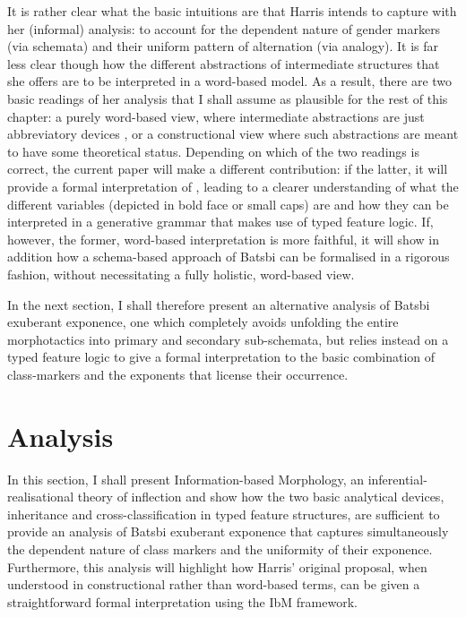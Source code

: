 \documentclass[output=paper]{langsci/langscibook}
\begin{document}
It is rather clear what the basic intuitions are that Harris intends
to capture with her (informal) analysis: to account for the dependent
nature of gender markers (via schemata) and their uniform pattern of
alternation (via analogy). It is far less clear though how the
different abstractions of intermediate structures that she offers are
to be interpreted in a word-based model. As a result, there are two
basic readings of her analysis that I shall assume as plausible for
the rest of this chapter: a purely word-based view, where intermediate
abstractions are just abbreviatory devices \citep[p.~298]{Harris09},
or a constructional view where such abstractions are meant to have
some theoretical status. Depending on which of the two readings
is correct, the current paper will make a different contribution: if
the latter, it will provide a formal interpretation of
\citet{Harris09}, leading to a clearer understanding of what the different
variables (depicted in bold face or small caps) are and how they can
be interpreted in a generative grammar that makes use of typed feature
logic.  If, however, the former, word-based interpretation is more
faithful, it will show in addition how a schema-based approach of
Batsbi can be formalised in a rigorous fashion, without necessitating
a fully holistic, word-based view.

In the next section, I shall therefore present an alternative analysis
of Batsbi exuberant exponence, one which completely avoids unfolding the
entire morphotactics into primary and secondary sub-schemata, but
relies instead on a typed feature logic to give a formal
interpretation to the basic combination of class-markers and the
exponents that license their occurrence.  

  


\section{Analysis}
\label{sec:Analysis}

In this section, I shall present Information-based Morphology, an
inferential-realisational theory of inflection and show how the two
basic analytical devices, inheritance and cross-classification in
typed feature structures, are sufficient to provide an analysis of
Batsbi exuberant exponence that captures simultaneously the dependent
nature of class markers and the uniformity of their
exponence. Furthermore, this analysis will highlight how Harris'
original proposal, when understood in constructional rather than
word-based terms, can be given a straightforward formal interpretation
using the IbM framework.
\end{document}
